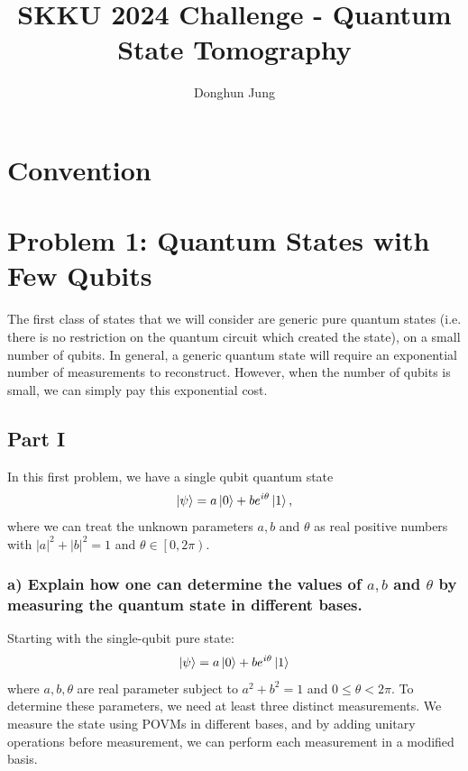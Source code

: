 \documentclass[a4paper, 11pt]{article}
\begin{document}
\title{SKKU 2024 Challenge - Quantum State Tomography}
\author{Donghun Jung}
\maketitle

\section{Convention}

\section*{Problem 1: Quantum States with Few Qubits}

The first class of states that we will consider are generic pure quantum states (i.e. there is no restriction on the quantum circuit which created the state), on a small number of qubits. In general, a generic quantum state will require an exponential number of measurements to reconstruct. However, when the number of qubits is small, we can simply pay this exponential cost.

\subsection*{Part I}

In this first problem, we have a single qubit quantum state
\begin{equation}
  \ket{\psi} = a\ket{0} + b e^{i\theta} \ket{1},
\end{equation}
where we can treat the unknown parameters $a,b$ and $\theta$ as real positive numbers with $|a|^2 + |b|^2 = 1$ and $\theta \in \left[ 0, 2\pi \right)$.

\subsubsection*{a) Explain how one can determine the values of $a, b$ and $\theta$ by measuring the quantum state in different bases.}

Starting with the single-qubit pure state:
\begin{equation}
\ket{\psi} = a\ket{0} + b e^{i\theta} \ket{1}
\label{eq:pure_single}
\end{equation}
where $a, b, \theta$ are real parameter subject to $a^2 + b^2 =1$ and $0 \leq \theta < 2\pi$. 
To determine these parameters, we need at least three distinct measurements.
We measure the state using POVMs in different bases, and by adding unitary operations before measurement, we can perform each measurement in a modified basis.
\end{document}
